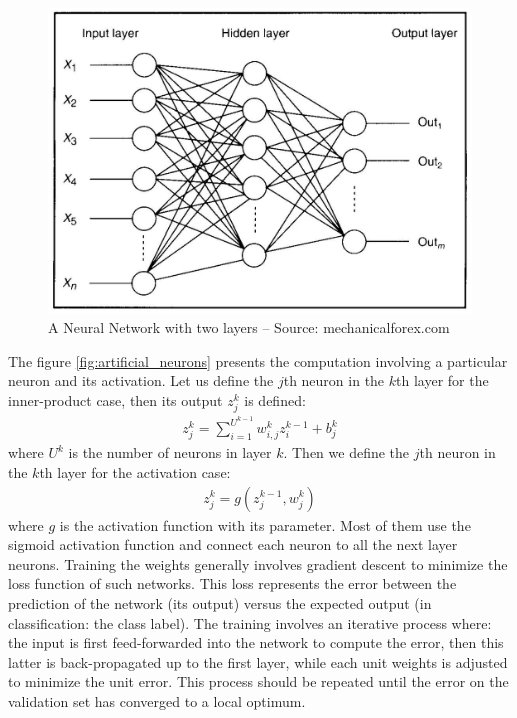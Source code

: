 \documentclass[a4paper,12pt]{report}
\begin{document}
\begin{figure}[h]
    \begin{center}
        \includegraphics{thesis_figures/NN.jpg}
    \end{center}
    \caption{A Neural Network with two layers -- Source: mechanicalforex.com}
    \label{fig:neural_network}
\end{figure}

The figure \ref{fig:artificial_neurons} presents the computation involving a particular neuron and its activation.
Let us define the $j$th neuron in the $k$th layer for the inner-product case, then its output $z^k_j$ is defined:
\begin{eqnarray}
    z^k_j = \sum_{i=1}^{U^{k-1}} w^k_{i,j} z^{k-1}_i + b^k_j
\end{eqnarray}
where $U^k$ is the number of neurons in layer $k$.
Then we define the $j$th neuron in the $k$th layer for the activation case:
\begin{eqnarray}
    z^k_j = g(z^{k-1}_j, w^k_{j})
\end{eqnarray}
where $g$ is the activation function with its parameter.
Most of them use the sigmoid activation function and connect each neuron to all the next layer neurons.
Training the weights generally involves gradient descent to minimize the loss function of such networks.
This loss represents the error between the prediction of the network (its output) versus the expected output (in classification: the class label).
The training involves an iterative process where: the input is first feed-forwarded into the network to compute the error, then this latter is back-propagated up to the first layer, while each unit weights is adjusted to minimize the unit error.
This process should be repeated until the error on the validation set has converged to a local optimum.
\end{document}

